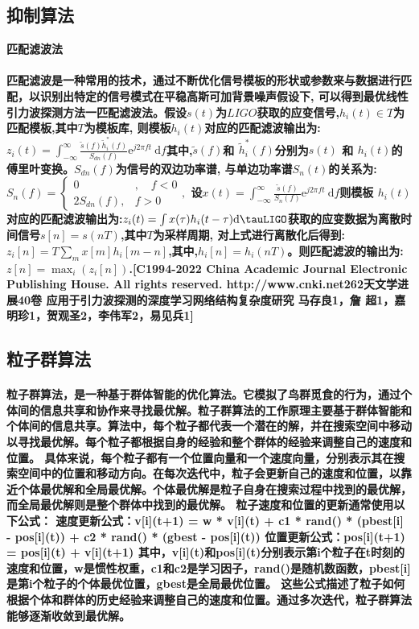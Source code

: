\documentclass{article}
\begin{document}
\subsection{抑制算法}
\textbf{匹配滤波法}
\paragraph{匹配滤波是一种常用的技术，通过不断优化信号模板的形状或参数来与数据进行匹配，以识别出特定的信号模式在平稳高斯可加背景噪声假设下, 可以得到最优线性引力波探测方法一匹配滤波法。假设$s(t)$为$LIGO$获取的应变信号,$h_{i}(t)\in T$为匹配模板,其中$T$为模板库, 则模板$h_{i}(t)$对应的匹配滤波输出为:
$z_{i}(t)=\int_{-\infty}^{\infty} \frac{\tilde{s}(f) \tilde{h}_{i}^{*}(f)}{S_{d n}(f)} \mathrm{e}^{j 2 \pi f t} \mathrm{~d}f$其中,$\tilde{s}(f)$和 $\tilde{h}_{i}^{*}(f)$分别为$s(t)$  和 $h_{i}(t)$的傅里叶变换。$S_{d n}(f)$为信号的双边功率谱, 与单边功率谱$S_{n}(t)$的关系为:
$S_{n}(f)=\left\{\begin{array}{ll}0 & , \quad f<0 \\2 S_{d n}(f), & f>0\end{array},\right.$
设$x(t)=\int_{-\infty}^{\infty} \frac{\tilde{s}(f)}{S_{n}(f)} \mathrm{e}^{j 2 \pi f t} \mathrm{~d} f$则模板 $h_{i}(t)$对应的匹配滤波输出为:$z_{i}(t)=\int x(\tau) h_{i}(t-\tau) \mathrm{d} \tauLIGO$获取的应变数据为离散时间信号$s[n]=s(n T)$,其中$T$为采样周期, 对上式进行离散化后得到:
$z_{i}[n]=T \sum_{m} x[m] h_{i}[m-n]$,其中,$h_{i}[n]=h_{i}(n T)$。则匹配滤波的输出为:
$z[n]=\max _{i}\left(z_{i}[n]\right)$.[C1994-2022 China Academic Journal Electronic Publishing House. All rights reserved. http://www.cnki.net262天文学进展40卷 应用于引力波探测的深度学习网络结构复杂度研究
马存良1，詹 超1，嘉明珍1，贺观圣2，李伟军2，易见兵1]}
\subsection{粒子群算法}
\paragraph{粒子群算法，是一种基于群体智能的优化算法。它模拟了鸟群觅食的行为，通过个体间的信息共享和协作来寻找最优解。粒子群算法的工作原理主要基于群体智能和个体间的信息共享。算法中，每个粒子都代表一个潜在的解，并在搜索空间中移动以寻找最优解。每个粒子都根据自身的经验和整个群体的经验来调整自己的速度和位置。
具体来说，每个粒子都有一个位置向量和一个速度向量，分别表示其在搜索空间中的位置和移动方向。在每次迭代中，粒子会更新自己的速度和位置，以靠近个体最优解和全局最优解。个体最优解是粒子自身在搜索过程中找到的最优解，而全局最优解则是整个群体中找到的最优解。
粒子速度和位置的更新通常使用以下公式：
速度更新公式：v[i](t+1) = w * v[i](t) + c1 * rand() * (pbest[i] - pos[i](t)) + c2 * rand() * (gbest - pos[i](t))
位置更新公式：pos[i](t+1) = pos[i](t) + v[i](t+1)
其中，v[i](t)和pos[i](t)分别表示第i个粒子在t时刻的速度和位置，w是惯性权重，c1和c2是学习因子，rand()是随机数函数，pbest[i]是第i个粒子的个体最优位置，gbest是全局最优位置。
这些公式描述了粒子如何根据个体和群体的历史经验来调整自己的速度和位置。通过多次迭代，粒子群算法能够逐渐收敛到最优解。}
\end{document}
